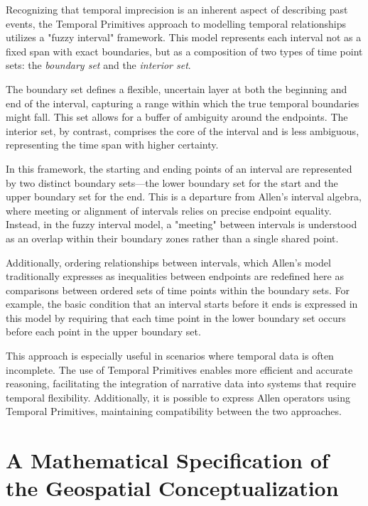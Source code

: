 Recognizing that temporal imprecision is an inherent aspect of describing past events, the Temporal Primitives approach to modelling temporal relationships utilizes a "fuzzy interval" framework. This model represents each interval not as a fixed span with exact boundaries, but as a composition of two types of time point sets: the \textit{boundary set} and the \textit{interior set}.

The boundary set defines a flexible, uncertain layer at both the beginning and end of the interval, capturing a range within which the true temporal boundaries might fall. This set allows for a buffer of ambiguity around the endpoints. The interior set, by contrast, comprises the core of the interval and is less ambiguous, representing the time span with higher certainty.

In this framework, the starting and ending points of an interval are represented by two distinct boundary sets—the lower boundary set for the start and the upper boundary set for the end. This is a departure from Allen’s interval algebra, where meeting or alignment of intervals relies on precise endpoint equality. Instead, in the fuzzy interval model, a "meeting" between intervals is understood as an overlap within their boundary zones rather than a single shared point.

Additionally, ordering relationships between intervals, which Allen’s model traditionally expresses as inequalities between endpoints are redefined here as comparisons between ordered sets of time points within the boundary sets. For example, the basic condition that an interval starts before it ends is expressed in this model by requiring that each time point in the lower boundary set occurs before each point in the upper boundary set.

This approach is especially useful in scenarios where temporal data is often incomplete. The use of Temporal Primitives enables more efficient and accurate reasoning, facilitating the integration of narrative data into systems that require temporal flexibility. Additionally, it is possible to express Allen operators using Temporal Primitives, maintaining compatibility between the two approaches.



\section{A Mathematical Specification of the Geospatial Conceptualization}\label{V-sec:mathematicalSpecification}

